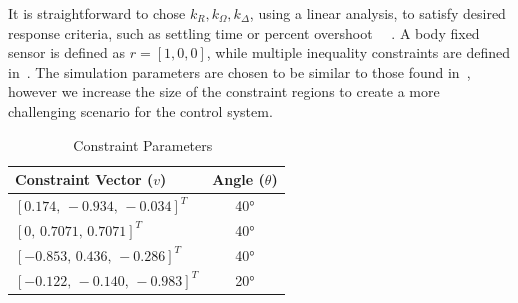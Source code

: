 \documentclass[10pt,fleqn]{IJCAS}  %
\providecommand{\DIFaddend}{} %
\begin{document}
\begin{multicols}{2}
{It is straightforward to chose \( k_R, k_\Omega, k_\Delta\), using a linear analysis, to satisfy desired response criteria, such as settling time or percent overshoot~\mbox{%
\cite{nise2004}}%
.
}\DIFaddend A body fixed sensor is defined as \(r = [1,0,0]\), while multiple inequality constraints are defined in~.
The simulation parameters are chosen to be similar to those found in~\cite{lee2011b}, however we increase the size of the constraint regions to create a more challenging scenario for the control system.
\begin{table}[H]
\caption{Constraint Parameters~\label{tab:constraints}}
\begin{center}\begin{tabular}{lc}
Constraint Vector (\( v \)) & Angle (\( \theta \)) \\ \hline \hline 
\([0.174,\,-0.934,\, -0.034]^T\) & \ang{40} \\ \hline 
\([0 ,\, 0.7071 ,\, 0.7071]^T\) & \ang{40} \\ \hline 
\([-0.853 ,\, 0.436 ,\, -0.286]^T\) & \ang{40} \\ \hline 
\([-0.122 ,\,-0.140,\, -0.983]^T\) & \ang{20}\end{tabular} 
\end{center}
\end{table}


\end{multicols}
\end{document}
